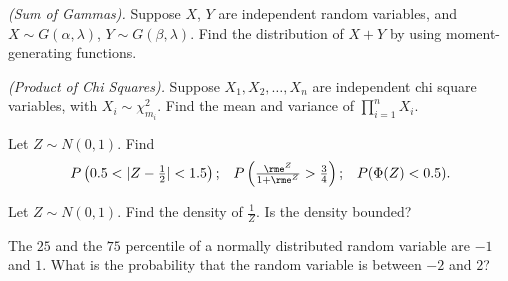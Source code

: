 \begin{problem}[Handout 13, \# 18]
  \emph{(Sum of Gammas).} Suppose \(X\), \(Y\) are independent random
  variables, and \(X\sim G(\alpha,\lambda)\), \(Y\sim
  G(\beta,\lambda)\). Find the distribution of \(X+Y\) by using
  moment-generating functions.
\end{problem}
\begin{solution}

\end{solution}
\newpage

\begin{problem}[Handout 13, \# 19]
  \emph{(Product of Chi Squares).} Suppose \(X_1,X_2,\dotsc,X_n\) are
  independent chi square variables, with \(X_i\sim\chi_{m_i}^2\). Find the
  mean and variance of \(\prod_{i=1}^n X_i\).
\end{problem}
\begin{solution}

\end{solution}
\newpage

\begin{problem}[Handout 13, \# 20]
  Let \(Z\sim N(0,1)\). Find
  \[
    \begin{aligned}
      P\left( 0.5<|Z-\tfrac{1}{2}|<1.5\right);
      && P\left(\tfrac{\rme^Z}{1+\rme^Z}>\tfrac{3}{4}\right);
      &&P(\Phi(Z)<0.5).
    \end{aligned}
  \]
\end{problem}
\begin{solution}

\end{solution}
\newpage

\begin{problem}[Handout 13, \# 21]
  Let \(Z\sim N(0,1)\). Find the density of \(\frac{1}{Z}\). Is the density
  bounded?
\end{problem}
\begin{solution}

\end{solution}
\newpage

\begin{problem}[Handout 13, \# 22]
  The \(25\) and the \(75\) percentile of a
  normally distributed random variable are \(-1\) and \(1\). What is the
  probability that the random variable is between \(-2\) and \(2\)?
\end{problem}
\begin{solution}

\end{solution}


